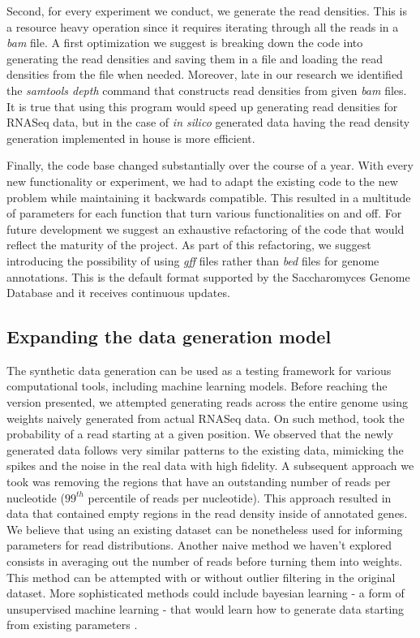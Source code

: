 \documentclass[12pt]{article}
\begin{document}
Second, for every experiment we conduct, we generate the read densities. This is a resource heavy operation since it requires iterating through all the reads in a \textit{bam} file. A first optimization we suggest is breaking down the code into generating the read densities and saving them in a file and loading the read densities from the file when needed. Moreover, late in our research we identified the \textit{samtools depth } command that constructs read densities from given \textit{bam} files. It is true that using this program would speed up generating read densities for RNASeq data, but in the case of \textit{in silico} generated data having the read density generation implemented in house is more efficient. 

Finally, the code base changed substantially over the course of a year. With every new functionality or experiment, we had to adapt the existing code to the new problem while maintaining it backwards compatible. This resulted in a multitude of parameters for each function that turn various functionalities on and off. For future development we suggest an exhaustive refactoring of the code that would reflect the maturity of the project. As part of this refactoring, we suggest introducing the possibility of using \textit{gff} files rather than \textit{bed} files for genome annotations. This is the default format supported by the Saccharomyces Genome Database and it receives continuous updates. 



\subsection{Expanding the data generation model}
The synthetic data generation can be used as a testing framework for various computational tools, including machine learning models. Before reaching the version presented, we attempted generating reads across the entire genome using weights naively generated from actual RNASeq data. On such method, took the probability of a read starting at a given position. We observed that the newly generated data follows very similar patterns to the existing data, mimicking the spikes and the noise in the real data with high fidelity. A subsequent approach we took was removing the regions that have an outstanding number of reads per nucleotide ($99^{th}$ percentile of reads per nucleotide). This approach resulted in data that contained empty regions in the read density inside of annotated genes. We believe that using an existing dataset can be nonetheless used for informing parameters for read distributions. Another naive method we haven't explored consists in averaging out the number of reads before turning them into weights. This method can be attempted with or without outlier filtering in the original dataset. More sophisticated methods could include bayesian learning - a form of unsupervised machine learning - that would learn how to generate data starting from existing parameters \cite{Sauta2020}.
\end{document}
